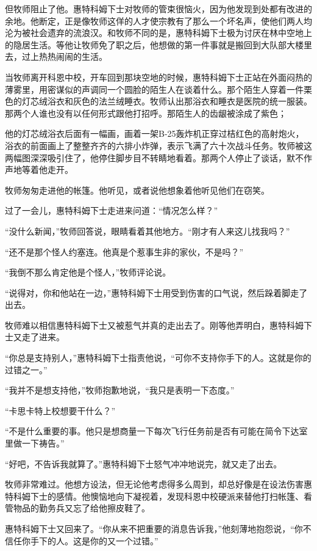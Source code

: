     但牧师阻止了他。惠特科姆下士对牧师的管束很恼火，因为他发现到处都有改进的余地。他断定，正是像牧师这佯的人才使宗教有了那么一个坏名声，使他们两人均沦为被社会遗弃的流浪汉。和牧师不同的是，惠特科姆下士极为讨厌在林中空地上的隐居生活。等他让牧师免了职之后，他想做的第一件事就是搬回到大队部大楼里去，过上热热闹闹的生活。

    当牧师离开科恩中校，开车回到那块空地的时候，惠特科姆下士正站在外面闷热的薄雾里，用密谋似的声调同一个圆脸的陌生人在谈着什么。那个陌生人穿着一件栗色的灯芯绒浴衣和灰色的法兰绒睡衣。牧师认出那浴衣和睡衣是医院的统一服装。那两个人谁也没有以任何形式跟他打招呼。那陌生人的齿龈被涂成了紫色；

    他的灯芯绒浴衣后面有一幅画，画着一架B-25轰炸机正穿过桔红色的高射炮火，浴衣的前面画上了整整齐齐的六排小炸弹，表示飞满了六十次战斗任务。牧师被这两幅图深深吸引住了，他停住脚步目不转睛地看着。那两个人停止了谈话，默不作声地等着他走开。

    牧师匆匆走进他的帐篷。他听见，或者说他想象着他听见他们在窃笑。

    过了一会儿，惠特科姆下士走进来问道：“情况怎么样？”

    “没什么新闻，”牧师回答说，眼睛看着其他地方。“刚才有人来这儿找我吗？”

    “还不是那个怪人约塞连。他真是个惹事生非的家伙，不是吗？”

    “我倒不那么肯定他是个怪人，”牧师评论说。

    “说得对，你和他站在一边，”惠特科姆下士用受到伤害的口气说，然后跺着脚走了出去。

    牧师难以相信惠特科姆下士又被惹气并真的走出去了。刚等他弄明白，惠特科姆下士又走了进来。

    “你总是支持别人，”惠特科姆下士指责他说，“可你不支持你手下的人。这就是你的过错之一。”

    “我并不是想支持他，”牧师抱歉地说，“我只是表明一下态度。”

    “卡思卡特上校想要干什么？”

    “不是什么重要的事。他只是想商量一下每次飞行任务前是否有可能在简令下达室里做一下祷告。”

    “好吧，不告诉我就算了。”惠特科姆下士怒气冲冲地说完，就又走了出去。

    牧师非常难过。他想方设法，但无论他考虑得多么周到，却总好像是在设法伤害惠特科姆下士的感情。他懊恼地向下凝视着，发现科恩中校硬派来替他打扫帐篷、看管物品的勤务兵又忘了给他擦皮鞋了。

    惠特科姆下士又回来了。“你从来不把重要的消息告诉我，”他刻薄地抱怨说，“你不信任你手下的人。这是你的又一个过错。”

